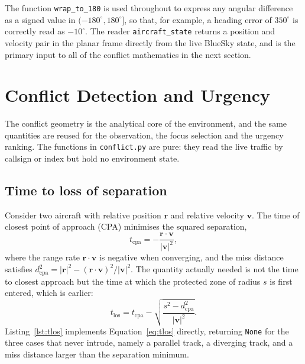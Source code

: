 The function \texttt{wrap\_to\_180} is used throughout to express any angular difference as a signed value in $(-180^\circ, 180^\circ]$, so that, for example, a heading error of $350^\circ$ is correctly read as $-10^\circ$. The reader \texttt{aircraft\_state} returns a position and velocity pair in the planar frame directly from the live BlueSky state, and is the primary input to all of the conflict mathematics in the next section.


\section{Conflict Detection and Urgency}
\label{sec:method_conflict}

The conflict geometry is the analytical core of the environment, and the same quantities are reused for the observation, the focus selection and the urgency ranking. The functions in \texttt{conflict.py} are pure: they read the live traffic by callsign or index but hold no environment state.

\subsection{Time to loss of separation}

Consider two aircraft with relative position $\mathbf{r}$ and relative velocity $\mathbf{v}$. The time of closest point of approach (CPA) minimises the squared separation,
\begin{equation}
\label{eq:tcpa}
t_{\text{cpa}} = -\frac{\mathbf{r} \cdot \mathbf{v}}{\lvert \mathbf{v} \rvert^2},
\end{equation}
where the range rate $\mathbf{r}\cdot\mathbf{v}$ is negative when converging, and the miss distance satisfies $d_{\text{cpa}}^2 = \lvert\mathbf{r}\rvert^2 - (\mathbf{r}\cdot\mathbf{v})^2/\lvert\mathbf{v}\rvert^2$. The quantity actually needed is not the time to closest approach but the time at which the protected zone of radius $s$ is first entered, which is earlier:
\begin{equation}
\label{eq:tlos}
t_{\text{los}} = t_{\text{cpa}} - \sqrt{\frac{s^2 - d_{\text{cpa}}^2}{\lvert\mathbf{v}\rvert^2}}.
\end{equation}
Listing~\ref{lst:tlos} implements Equation~\ref{eq:tlos} directly, returning \texttt{None} for the three cases that never intrude, namely a parallel track, a diverging track, and a miss distance larger than the separation minimum.

